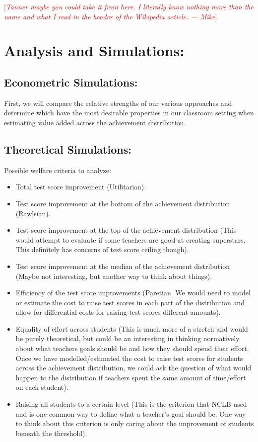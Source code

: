 \documentclass[letterpaper,12pt]{article}
\newcommand\cmnt[2]{\;
{\textcolor{red}{[{\em #1 --- #2}] \;}
}}
\newcommand\Mike[1]{\cmnt{#1}{Mike}}
\begin{document}
\Mike{Tanner maybe you could take it from here. I literally know nothing more than the name and what I read in the header of the Wikipedia article.}



\section{Analysis and Simulations:}

\subsection{Econometric Simulations:}
First, we will compare the relative strengths of our various approaches and determine which have the most desirable properties in our classroom setting when estimating value added across the achievement distribution.


\subsection{Theoretical Simulations:}

Possible welfare criteria to analyze:

    \begin{itemize}
        \item Total test score improvement (Utilitarian).
        \item Test score improvement at the bottom of the achievement distribution (Rawlsian).
        \item Test score improvement at the top of the achievement distribution (This would attempt to evaluate if some teachers are good at creating superstars. This definitely has concerns of test score ceiling though).
        \item Test score improvement at the median of the achievement distribution (Maybe not interesting, but another way to think about things).
        \item Efficiency of the test score improvements (Paretian. We would need to model or estimate the cost to raise test scores in each part of the distribution and allow for differential costs for raising test scores different amounts).
        \item Equality of effort across students (This is much more of a stretch and would be purely theoretical, but could be an interesting in thinking normatively about what teachers goals should be and how they should spend their effort. Once we have modelled/estimated the cost to raise test scores for students across the achievement distribution, we could ask the question of what would happen to the distribution if teachers spent the same amount of time/effort on each student).
        \item Raising all students to a certain level (This is the criterion that NCLB used and is one common way to define what a teacher's goal should be. One way to think about this criterion is only caring about the improvement of students beneath the threshold).
    \end{itemize}
\end{document}
